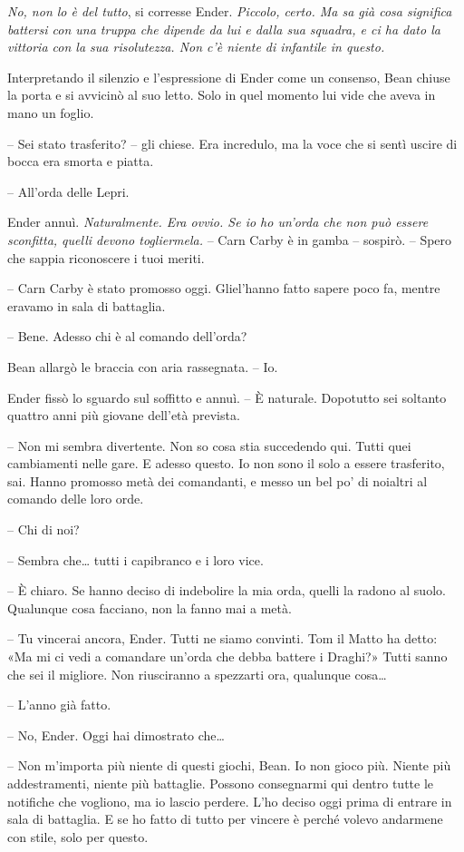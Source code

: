 \emph{{No, non lo è del tutto}}{, \emph{} si corresse Ender.
	\emph{Piccolo, certo. Ma sa già cosa significa battersi con una truppa
		che dipende da lui e dalla sua squadra, e ci ha dato la vittoria con la
		sua risolutezza. Non c'è niente di infantile in questo.}}

{Interpretando il silenzio e l'espressione di Ender come un consenso,
	Bean chiuse la porta e si avvicinò al suo letto. Solo in quel momento
	lui vide che aveva in mano un foglio.}

{-- Sei stato trasferito? -- gli chiese. Era incredulo, ma la voce che
	si sentì uscire di bocca era smorta e piatta.}

{-- All'orda delle Lepri.}

{Ender annuì. \emph{Naturalmente. Era ovvio. Se io ho un'orda che non
		può essere sconfitta, quelli devono togliermela.} -- Carn Carby è in
	gamba -- sospirò. -- Spero che sappia riconoscere i tuoi meriti.}

{-- Carn Carby è stato promosso oggi. Gliel'hanno fatto sapere poco fa,
	mentre eravamo in sala di battaglia.}

{-- Bene. Adesso chi è al comando dell'orda?}

{Bean allargò le braccia con aria rassegnata. -- Io.}

{Ender fissò lo sguardo sul soffitto e annuì. -- È naturale. Dopotutto
	sei soltanto quattro anni più giovane dell'età prevista.}

{-- Non mi sembra divertente. Non so cosa stia succedendo qui. Tutti
	quei cambiamenti nelle gare. E adesso questo. Io non sono il solo a
	essere trasferito, sai. Hanno promosso metà dei comandanti, e messo un
	bel po' di noialtri al comando delle loro orde.}

{-- Chi di noi?}

{-- Sembra che\ldots{} tutti i capibranco e i loro vice.}

{-- È chiaro. Se hanno deciso di indebolire la mia orda, quelli la
	radono al suolo. Qualunque cosa facciano, non la fanno mai a metà.}

{-- Tu vincerai ancora, Ender. Tutti ne siamo convinti. Tom il Matto ha
	detto: «Ma mi ci vedi a comandare un'orda che debba battere i Draghi?»
	Tutti sanno che sei il migliore. Non riusciranno a spezzarti ora,
	qualunque cosa\ldots{}}

{-- L'anno già fatto.}

{-- No, Ender. Oggi hai dimostrato che\ldots{}}

{-- Non m'importa più niente di questi giochi, Bean. Io non gioco più.
	Niente più addestramenti, niente più battaglie. Possono consegnarmi qui
	dentro tutte le notifiche che vogliono, ma io lascio perdere. L'ho
	deciso oggi prima di entrare in sala di battaglia. E se ho fatto di
	tutto per vincere è perché volevo andarmene con stile, solo per questo.}

